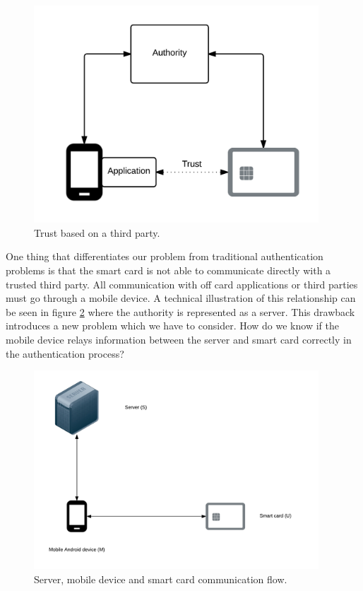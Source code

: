 \begin{figure}[h!]
  \caption{Trust based on a third party.}
  \label{fig:standardAuth}
  \centering
    \includegraphics[width=0.95\textwidth]{images/standardAuth2.png}
\end{figure}

One thing that differentiates our problem from traditional authentication problems is that the smart card is not able to communicate directly with a trusted third party. All communication with off card applications or third parties must go through a mobile device. A technical illustration of this relationship can be seen in figure \ref{fig:smu} where the authority is represented as a server. This drawback introduces a new problem which we have to consider. How do we know if the mobile device relays information between the server and smart card correctly in the authentication process?

\begin{figure}[h!]
  \caption{Server, mobile device and smart card communication flow.}
  \label{fig:smu}
  \centering
    \includegraphics[width=0.95\textwidth]{images/SMU.png}
\end{figure}

